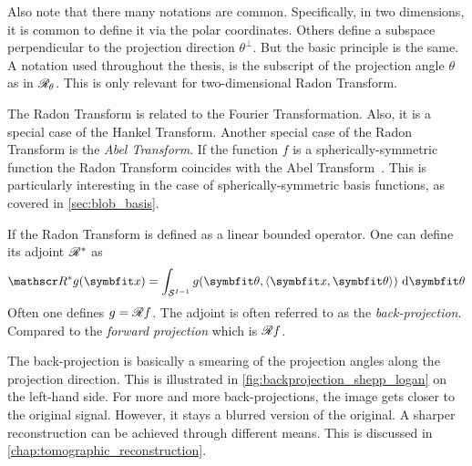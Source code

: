 Also note that there many notations are common. Specifically, in two dimensions, it is common to
define it via the polar coordinates. Others define a subspace perpendicular to the projection
direction \(\theta^\perp\). But the basic principle is the same. A notation used throughout the
thesis, is the subscript of the projection angle \(\theta\) as in \(\mathscr{R}_\theta\). This is only
relevant for two-dimensional Radon Transform.

The Radon Transform is related to the Fourier Transformation. Also, it is a special case of the
Hankel Transform. Another special case of the Radon Transform is the \textit{Abel Transform}. If the
function \(f\) is a spherically-symmetric function the Radon Transform coincides with the Abel
Transform~\cite{buzug_computed_2008}. This is particularly interesting in the case of
spherically-symmetric basis functions, as covered in \autoref{sec:blob_basis}.

\begin{definition}\label{def:back_projection}
	If the Radon Transform is defined as a linear bounded operator. One can define its adjoint
	\(\mathscr{R}^\ast\) as
	\[ \radon^\ast g (\mvec{x}) = \int_{\mathcal{S}^{I-1}} g(\mvec{\theta}, \langle \mvec{x}, \mvec{\theta} \rangle) \, \, \mathrm{d} \mvec{\theta} \]
	Often one defines \(g = \mathscr{R} f\). The adjoint is often referred to as the
	\textit{back-projection}. Compared to the \textit{forward projection} which is \(\mathscr{R} f\).
\end{definition}

The back-projection is basically a smearing of the projection angles along the projection direction.
This is illustrated in \autoref{fig:backprojection_shepp_logan} on the left-hand side. For more and
more back-projections, the image gets closer to the original signal. However, it stays a blurred
version of the original. A sharper reconstruction can be achieved through different means. This is
discussed in \autoref{chap:tomographic_reconstruction}.

